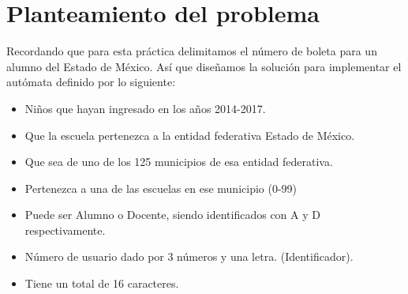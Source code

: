 \documentclass[12pt]{article}
\begin{document}

	\section{Planteamiento del problema}
	Recordando que para esta práctica delimitamos el número de boleta para un alumno del Estado de México.
	Así que diseñamos la solución para implementar el autómata definido por lo siguiente:

	\begin{itemize}
		\item Niños que hayan ingresado en los años 2014-2017.								
		\item Que la escuela pertenezca a la entidad federativa Estado de México. 			
		\item Que sea de uno de los 125 municipios de esa entidad federativa.				
		\item Pertenezca a una de las escuelas en ese municipio (0-99)						
		\item Puede ser Alumno o Docente, siendo identificados con A y D respectivamente.	
		\item Número de usuario dado por 3 números y una letra.	(Identificador).							
		\item Tiene un total de 16 caracteres.
	\end{itemize}
\end{document}
